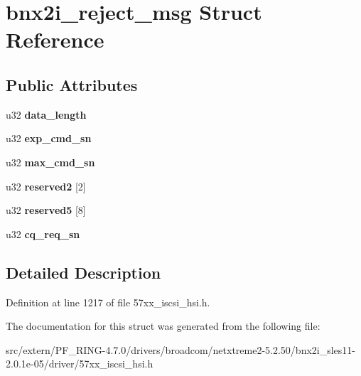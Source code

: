 \hypertarget{structbnx2i__reject__msg}{
\section{bnx2i\_\-reject\_\-msg Struct Reference}
\label{structbnx2i__reject__msg}
}
\subsection*{Public Attributes}
\begin{DoxyCompactItemize}
\item 
\hypertarget{structbnx2i__reject__msg_a99165a7120cb16b19ed62f5e57092363}{
u32 {\bfseries data\_\-length}}
\label{structbnx2i__reject__msg_a99165a7120cb16b19ed62f5e57092363}

\item 
\hypertarget{structbnx2i__reject__msg_aa3f4fb331ed87d362d9c949eae0df70d}{
u32 {\bfseries exp\_\-cmd\_\-sn}}
\label{structbnx2i__reject__msg_aa3f4fb331ed87d362d9c949eae0df70d}

\item 
\hypertarget{structbnx2i__reject__msg_adbaf4ecab9900810b977f613f7e20dc1}{
u32 {\bfseries max\_\-cmd\_\-sn}}
\label{structbnx2i__reject__msg_adbaf4ecab9900810b977f613f7e20dc1}

\item 
\hypertarget{structbnx2i__reject__msg_a5276e232abd7fb18862207992089dfe1}{
u32 {\bfseries reserved2} \mbox{[}2\mbox{]}}
\label{structbnx2i__reject__msg_a5276e232abd7fb18862207992089dfe1}

\item 
\hypertarget{structbnx2i__reject__msg_a4dd7e60342e08bd5f9107db7e7e0a226}{
u32 {\bfseries reserved5} \mbox{[}8\mbox{]}}
\label{structbnx2i__reject__msg_a4dd7e60342e08bd5f9107db7e7e0a226}

\item 
\hypertarget{structbnx2i__reject__msg_a5f1b5a779fba11213fdefa5ed5717ed2}{
u32 {\bfseries cq\_\-req\_\-sn}}
\label{structbnx2i__reject__msg_a5f1b5a779fba11213fdefa5ed5717ed2}

\end{DoxyCompactItemize}


\subsection{Detailed Description}


Definition at line 1217 of file 57xx\_\-iscsi\_\-hsi.h.



The documentation for this struct was generated from the following file:\begin{DoxyCompactItemize}
\item 
src/extern/PF\_\-RING-\/4.7.0/drivers/broadcom/netxtreme2-\/5.2.50/bnx2i\_\-sles11-\/2.0.1e-\/05/driver/57xx\_\-iscsi\_\-hsi.h\end{DoxyCompactItemize}
